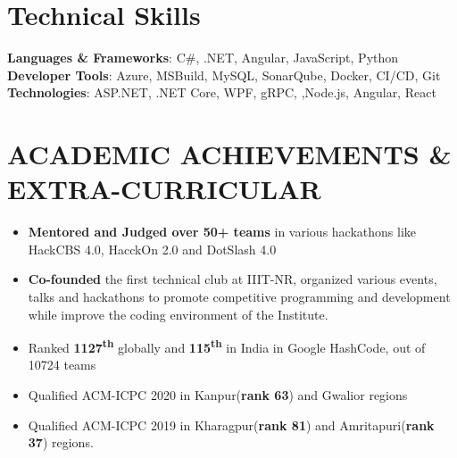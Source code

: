 \documentclass[letterpaper,11pt]{article}
\newcommand{\achievementItem}[1]{
  \item\small{
    {#1 \vspace{-6pt}}
  }
}
\begin{document}
\section{Technical Skills}
 \begin{itemize}[leftmargin=0.15in, label={}]
    {\item{
     \textbf{Languages \& Frameworks}{: C\#, .NET, Angular, JavaScript, Python} \\
     \vspace{1pt}
     \textbf{Developer Tools}{: Azure, MSBuild, MySQL, SonarQube, Docker, CI/CD, Git} \\
     \vspace{1pt}
     \textbf{Technologies}{: ASP.NET, .NET Core, WPF, gRPC, ,Node.js, Angular, React} \\
    }}
 \end{itemize}
 \vspace{-16pt}



\section{ACADEMIC ACHIEVEMENTS \& EXTRA-CURRICULAR}

\begin{itemize}[leftmargin=0.2in]
  \achievementItem{\textbf{Mentored and Judged over 50+ teams} in various hackathons like HackCBS 4.0, HacckOn 2.0 and DotSlash 4.0}
  \achievementItem{\textbf{Co-founded}  the  first  technical  club  at  IIIT-NR,  organized  various  events, talks and hackathons to  promote competitive programming and development while improve the coding environment of the Institute.}
  \achievementItem{Ranked \textbf{1127\textsuperscript{th}} globally and \textbf{115\textsuperscript{th}} in India in Google HashCode, out of 10724 teams}
  \achievementItem{Qualified ACM-ICPC 2020 in Kanpur(\textbf{rank 63}) and Gwalior regions}
  \achievementItem{Qualified ACM-ICPC 2019 in Kharagpur(\textbf{rank 81}) and Amritapuri(\textbf{rank 37}) regions.}
\end{itemize}
\end{document}
